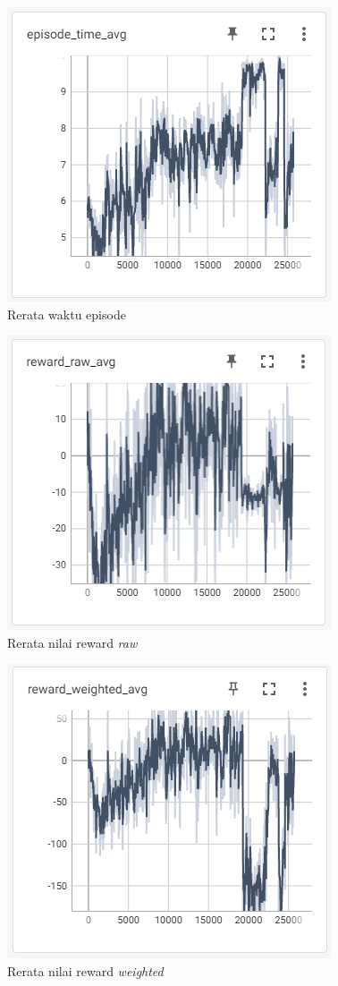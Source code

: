 \begin{figure}[H] 
	\centering
	\includegraphics[width=.7\linewidth]{images/episode_time_avg}
	\caption{Rerata waktu episode}
	\label{fig:episode_time_avg}
\end{figure}
\begin{figure}[H] 
	\centering
	\includegraphics[width=.7\linewidth]{images/reward_raw_avg}
	\caption{Rerata nilai reward \textit{raw}}
	\label{fig:reward_raw_avg}
\end{figure}
\begin{figure}[H] 
	\centering
	\includegraphics[width=.7\linewidth]{images/reward_weighted_avg}
	\caption{Rerata nilai reward \textit{weighted}}
	\label{fig:reward_weighted_avg}
\end{figure}

